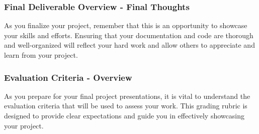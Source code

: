 \documentclass[aspectratio=169]{beamer}
\begin{document}
\begin{frame}[fragile]
    \frametitle{Final Deliverable Overview - Final Thoughts}
    As you finalize your project, remember that this is an opportunity to showcase your skills and efforts. Ensuring that your documentation and code are thorough and well-organized will reflect your hard work and allow others to appreciate and learn from your project.
\end{frame}

\begin{frame}[fragile]
    \frametitle{Evaluation Criteria - Overview}
    As you prepare for your final project presentations, it is vital to understand the evaluation criteria that will be used to assess your work. This grading rubric is designed to provide clear expectations and guide you in effectively showcasing your project.
\end{frame}
\end{document}
